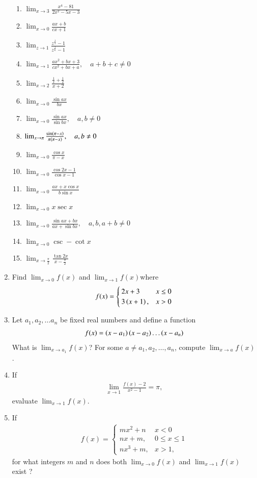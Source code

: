 \begin{enumerate}[label=\arabic*.,ref=\thesubsection.\theenumi]
\begin{enumerate}
\item  $\lim_{x\to 3} \frac{x^4-81}{2x^2-5x-3}$
\item  $\lim_{x\to 0} \frac{ax+b}{cx+1}$
\item  $\lim_{z\to 1} \frac{z^{\frac{1}{3}}-1}{z^{\frac{1}{6}}-1}$
\item  $\lim_{x\to 1} \frac{ax^2+bx+3}{cx^2+bx+a}, \quad a+b+c \ne 0$
\item  $\lim_{x\to 2} \frac{\frac{1}{x}+\frac{1}{2}}{x+2}$
\item  $\lim_{x\to 0} \frac{\sin ax}{bx}$
\item  $\lim_{x\to 0} \frac{\sin ax}{\sin bx}, \quad a,b \ne 0$
\item  $\lim_{x\to \pi} \frac{\sin \left(\pi-x\right)}{\pi \left(\pi-x\right)}, \quad a,b \ne 0$
\item  $\lim_{x\to 0} \frac{\cos x}{\pi -x}$
\item  $\lim_{x\to 0} \frac{\cos 2x-1}{\cos x-1}$
\item  $\lim_{x\to 0} \frac{ax + x\cos x}{b\sin x}$
\item  $\lim_{x\to 0} x\sec x$
\item  $\lim_{x\to 0} \frac{\sin ax + bx}{ax+\sin bx}, \quad a,b, a+b \ne 0$
\item  $\lim_{x\to 0} \csc - \cot x$
\item  $\lim_{x\to \frac{\pi}{2}} \frac{\tan 2x}{x-\frac{\pi}{2}}$
\end{enumerate}
%
\item Find $\lim_{x\to 0} f(x)$ and $\lim_{x\to 1} f(x)$where
\begin{align}
f(x) = 
\begin{cases}
2x+3 & x \le 0
\\
3\left(x+1\right), & x > 0
\end{cases}
\end{align}
%
\item Let $a_1, a_2, \dots a_n$ be fixed real numbers and define a function
\begin{align}
f(x) = \left(x-a_1\right)\left(x-a_2\right)\dots \left(x-a_n\right)
\end{align}
%
What is $\lim_{x\to a_1} f(x)$?  For some $a \ne a_1, a_2, \dots, a_n$, compute $\lim_{x\to a} f(x)$.
%
\item If 
%
\begin{align}
\lim_{x\to 1} \frac{f(x)-2}{x^2-1} = \pi, 
\end{align}
%
evaluate $\lim_{x\to 1} f(x)$.
%
\item If 
%
\begin{align}
f(x) = 
\begin{cases}
mx^2+n & x < 0
\\
nx +m, & 0\le x \le 1
\\
nx^3+m, & x > 1,
\end{cases}
\end{align}
%
for what integers $m$ and $n$ does both  $\lim_{x\to 0} f(x)$ and $\lim_{x\to 1} f(x)$ exist ?
%


\end{enumerate}
